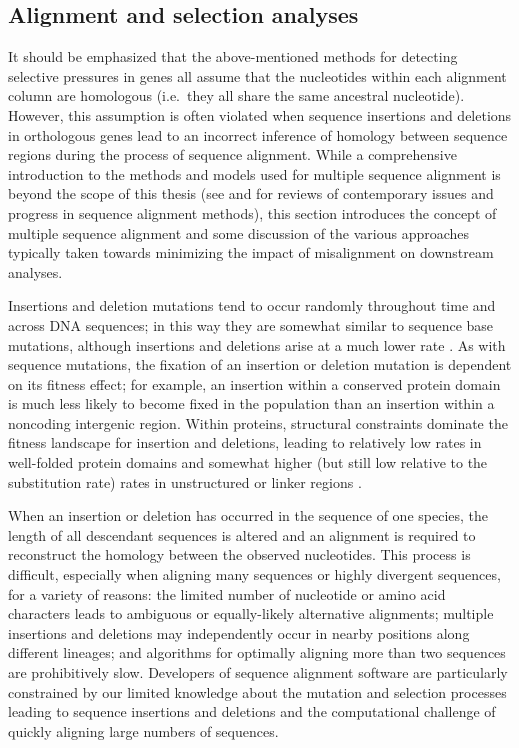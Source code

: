 \subsection{Alignment and selection analyses}


It should be emphasized that the above-mentioned methods for detecting
selective pressures in genes all assume that the nucleotides within
each alignment column are homologous (i.e.\ they all share the same
ancestral nucleotide). However, this assumption is often violated when
sequence insertions and deletions in orthologous genes lead to an
incorrect inference of homology between sequence regions during the
process of sequence alignment. While a comprehensive introduction to
the methods and models used for multiple sequence alignment is beyond
the scope of this thesis (see \citet{Kemena2009} and
\citet{Notredame2007Recent} for reviews of contemporary issues and progress
in sequence alignment methods), this section introduces the concept of
multiple sequence alignment and some discussion of the various
approaches typically taken towards minimizing the impact of
misalignment on downstream analyses.

Insertions and deletion mutations tend to occur randomly throughout
time and across DNA sequences; in this way they are somewhat similar
to sequence base mutations, although insertions and deletions arise at
a much lower rate \citep{Benner1993Empirical}. As with sequence mutations, the
fixation of an insertion or deletion mutation is dependent on its
fitness effect; for example, an insertion within a conserved protein
domain is much less likely to become fixed in the population than an
insertion within a noncoding intergenic region. Within proteins,
structural constraints dominate the fitness landscape for insertion
and deletions, leading to relatively low rates in well-folded protein
domains and somewhat higher (but still low relative to the
substitution rate) rates in unstructured or linker regions
\citep{delaChaux2007DNA}.

When an insertion or deletion has occurred in the sequence of one
species, the length of all descendant sequences is altered and an
alignment is required to reconstruct the homology between the observed
nucleotides. This process is difficult, especially when aligning many
sequences or highly divergent sequences, for a variety of reasons: the
limited number of nucleotide or amino acid characters leads to
ambiguous or equally-likely alternative alignments; multiple
insertions and deletions may independently occur in nearby positions
along different lineages; and algorithms for optimally aligning more
than two sequences are prohibitively slow. Developers of sequence
alignment software are particularly constrained by our limited
knowledge about the mutation and selection processes leading to
sequence insertions and deletions and the computational challenge of
quickly aligning large numbers of sequences.

